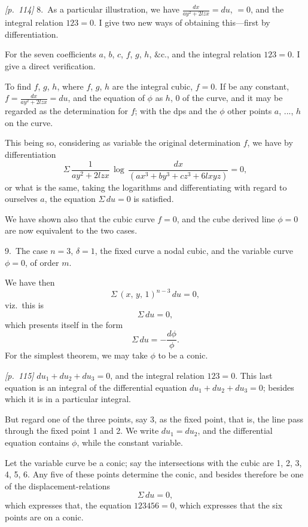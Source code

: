 \documentclass[11pt,a4paper]{article}
\theoremstyle{plain}
\theoremstyle{definition}
\theoremstyle{remark}
\begin{document}
\bigskip\noindent\textit{[p.~114]} 8.\ As a particular illustration, we have $\frac{dx}{ay^2 + 2lzx} = du$, $= 0$, and the integral relation $123 = 0$. I give two new ways of obtaining this---first by differentiation.

For the seven coefficients $a$, $b$, $c$, $f$, $g$, $h$, $\&$c., and the integral relation $123 = 0$. I give a direct verification.

To find $f$, $g$, $h$, where $f$, $g$, $h$ are the integral cubic, $f = 0$. If be any constant, $f = \frac{dx}{ay^2 + 2lzx} = du$, and the equation of $\phi$ as $h$, $0$ of the curve, and it may be regarded as the determination for $f$; with the dps and the $\phi$ other points $a$, ..., $h$ on the curve.

This being so, considering as variable the original determination $f$, we have by differentiation
\[
\Sigma\,\frac{1}{ay^2 + 2lzx}\,\log\,\frac{dx}{(ax^3 + by^3 + cz^3 + 6lxyz)} = 0,
\]
or what is the same, taking the logarithms and differentiating with regard to ourselves $a$, the equation $\Sigma\,du = 0$ is satisfied.

We have shown also that the cubic curve $f = 0$, and the cube derived line $\phi = 0$ are now equivalent to the two cases.

\bigskip

9.\ The case $n = 3$, $\delta = 1$, the fixed curve a nodal cubic, and the variable curve $\phi = 0$, of order $m$.

We have then
\[
\Sigma\,(x,\,y,\,1)^{n-3}\,du = 0,
\]
viz.\ this is
\[
\Sigma\,du = 0,
\]
which presents itself in the form
\[
\Sigma\,du = -\frac{d\phi}{\phi}.
\]
For the simplest theorem, we may take $\phi$ to be a conic.

\bigskip\noindent\textit{[p.~115]} $du_1 + du_2 + du_3 = 0$, and the integral relation $123 = 0$. This last equation is an integral of the differential equation $du_1 + du_2 + du_3 = 0$; besides which it is in a particular integral.

But regard one of the three points, say 3, as the fixed point, that is, the line pass through the fixed point 1 and 2. We write $du_1 = du_2$, and the differential equation contains $\phi$, while the constant variable.

Let the variable curve be a conic; say the intersections with the cubic are 1, 2, 3, 4, 5, 6. Any five of these points determine the conic, and besides therefore be one of the displacement-relations
\[
\Sigma\,du = 0,
\]
which expresses that, the equation $123456 = 0$, which expresses that the six points are on a conic.
\end{document}

